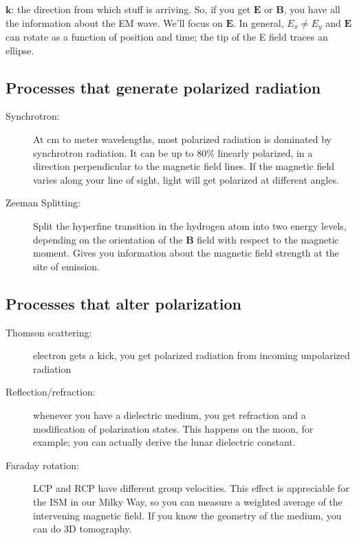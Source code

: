 \documentclass[a4paper]{article}
\begin{document}
$ \mathbf{k} $: the direction from which stuff is arriving. So, if you get $ \mathbf{E} $ or $ \mathbf{B} $, you have all the information about the EM wave. We'll focus on $ \mathbf{E} $. In general, $E_x \neq E_y$ and $ \mathbf{E} $ can rotate as a function of position and time; the tip of the E field traces an ellipse. 

\subsection{Processes that generate polarized radiation}

\begin{description}

\item[Synchrotron:] At cm to meter wavelengths, most polarized radiation is dominated by synchrotron radiation. It can be up to 80\% linearly polarized, in a direction perpendicular to the magnetic field lines. If the magnetic field varies along your line of sight, light will get polarized at different angles. 

\item[Zeeman Splitting:] Split the hyperfine transition in the hydrogen atom into two energy levels, depending on the orientation of the $\mathbf{B}$ field with respect to the magnetic moment. Gives you information about the magnetic field strength at the site of emission. 

\end{description}

\subsection{Processes that alter polarization}

\begin{description}

\item[Thomson scattering:] electron gets a kick, you get polarized radiation from incoming unpolarized radiation

\item[Reflection/refraction:] whenever you have a dielectric medium, you get refraction and a modification of polarization states. This happens on the moon, for example; you can actually derive the lunar dielectric constant. 

\item[Faraday rotation:] LCP and RCP have different group velocities. This effect is appreciable for the ISM in our Milky Way, so you can measure a weighted average of the intervening magnetic field. If you know the geometry of the medium, you can do 3D tomography.

\end{description}
\end{document}
